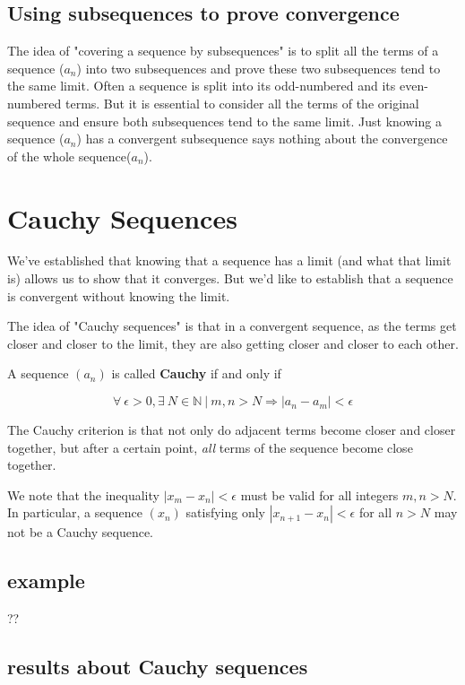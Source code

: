 \documentclass[11pt, oneside]{article}
\begin{document}
\subsection*{Using subsequences to prove convergence}

The idea of "covering a sequence by subsequences" is to split all the terms of a sequence ($a_n$) into two subsequences and prove these two subsequences tend to the same limit. Often a sequence is split into its odd-numbered and its even-numbered terms. But it is essential to consider all the terms of the original sequence and ensure both subsequences tend to the same limit. Just knowing a sequence ($a_n$) has a convergent subsequence says nothing about the convergence of the whole sequence($a_n$).

\section{Cauchy Sequences}

We've established that knowing that a sequence has a limit (and what that limit is) allows us to show that it converges.  But we'd like to establish that a sequence is convergent without knowing the limit.

The idea of "Cauchy sequences" is that in a convergent sequence, as the terms get closer and closer to the limit, they are also getting closer and closer to each other.

A sequence $(a_n)$ is called \textbf{Cauchy} if and only if

\[ \forall \ \epsilon > 0, \exists \ N \in \mathbb{N} \ | \ m, n > N \Rightarrow |a_n - a_m| < \epsilon \]

The Cauchy criterion is that not only do adjacent terms become closer and closer together, but after a certain point, \emph{all} terms of the sequence become close together.

We note that the inequality $| x_m  - x_n | < \epsilon$ must be valid for all integers $m,n > N$.  In particular, a sequence $(x_n)$ satisfying only $|x_{n+1} -  x_n | < \epsilon$ for all $n > N$ may not be a Cauchy sequence.

\subsection*{example}
??

\subsection*{results about Cauchy sequences}
\end{document}
